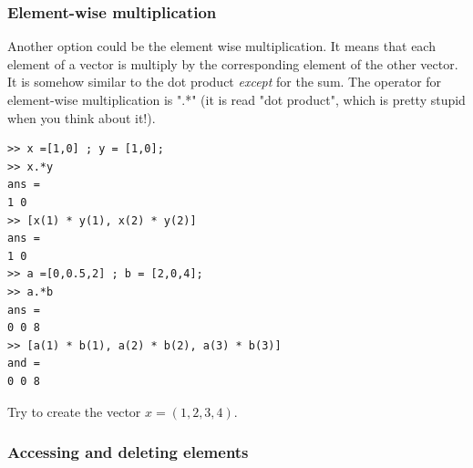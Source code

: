 		\subsubsection{Element-wise multiplication}
			Another option could be the element wise multiplication.
			It means that each element of a vector is multiply by the corresponding element of the other vector.
			It is somehow similar to the dot product \emph{except} for the sum.
			The operator for element-wise multiplication is ".*" (it is read "dot product", which is pretty stupid when you think about it!).
\begin{lstlisting}
>> x =[1,0] ; y = [1,0];
>> x.*y
ans = 
1 0
>> [x(1) * y(1), x(2) * y(2)]
ans =
1 0
>> a =[0,0.5,2] ; b = [2,0,4];
>> a.*b
ans = 
0 0 8
>> [a(1) * b(1), a(2) * b(2), a(3) * b(3)]
and =
0 0 8
\end{lstlisting}

Try to create the vector $x = (1,2,3,4)$.

		\subsubsection{Accessing and deleting elements}

